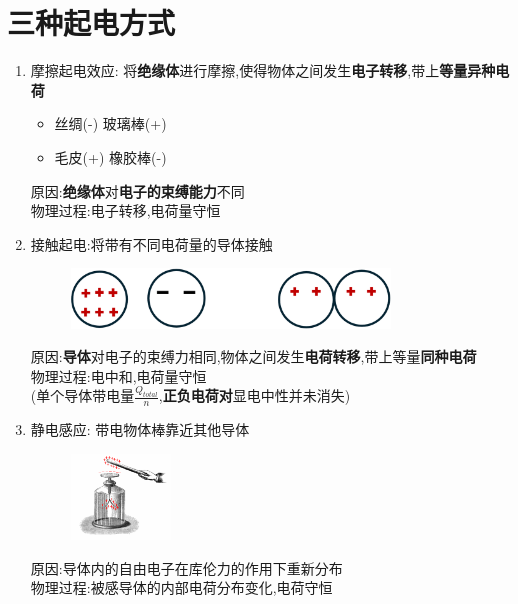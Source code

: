 \documentclass{article}
\begin{document}
    \section{三种起电方式}
    \begin{enumerate}
        \item 摩擦起电效应: 将\textbf{绝缘体}进行摩擦,使得物体之间发生\textbf{电子转移},带上\textbf{等量异种电荷}
            \begin{itemize}[label={}]
                \item 丝绸(-) 玻璃棒(+)   
                \item 毛皮(+) 橡胶棒(-)   
            \end{itemize}
        原因:\textbf{绝缘体}对\textbf{电子的束缚能力}不同   \\
        物理过程:电子转移,电荷量守恒

        \item 接触起电:将带有不同电荷量的导体接触
        \begin{figure}[h]
            \centering
            \includegraphics[width=0.8\textwidth]{./pictures/1.png}
        \end{figure}

        原因:\textbf{导体}对电子的束缚力相同,物体之间发生\textbf{电荷转移},带上等量\textbf{同种电荷}  \\    
        物理过程:电中和,电荷量守恒  \\
        (单个导体带电量$\frac{Q_{total}}{n}$,\textbf{正负电荷对}显电中性并未消失)

        \newpage

        \item 静电感应: 带电物体棒靠近其他导体
        \begin{figure}[h]
            \centering
            \includegraphics[width=0.25\textwidth]{./pictures/2.png}
        \end{figure}

        原因:导体内的自由电子在库伦力的作用下重新分布 \\
        物理过程:被感导体的内部电荷分布变化,电荷守恒        
    \end{enumerate}
\end{document}
